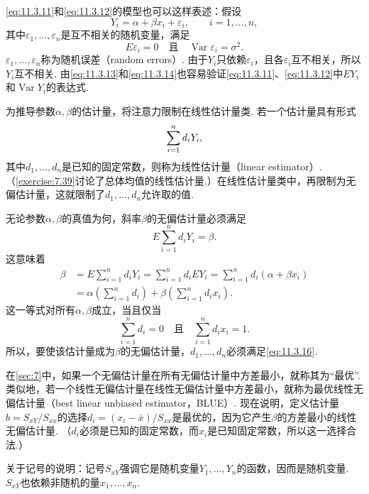 \eqref{eq:11.3.11}和\eqref{eq:11.3.12}的模型也可以这样表述：假设
\begin{equation}\label{eq:11.3.13}
Y_i=\alpha+\beta x_i+\varepsilon_i,\qquad i=1,\ldots,n,
\end{equation}
其中$\varepsilon_1,\ldots,\varepsilon_n$是互不相关的随机变量，满足
\begin{equation}\label{eq:11.3.14}
E\varepsilon_i=0\quad\text{且}\quad\operatorname{Var}\varepsilon_i=\sigma^2.
\end{equation}
$\varepsilon_1,\ldots,\varepsilon_n$称为随机误差（random errors）. 由于$Y_i$只依赖$\varepsilon_i$，且各$\varepsilon_i$互不相关，所以$Y_i$互不相关. 由\eqref{eq:11.3.13}和\eqref{eq:11.3.14}也容易验证\eqref{eq:11.3.11}、\eqref{eq:11.3.12}中$EY_i$和$\operatorname{Var}Y_i$的表达式.

为推导参数$\alpha,\beta$的估计量，将注意力限制在线性估计量类. 若一个估计量具有形式
\begin{equation}\label{eq:11.3.15}\index{SI0792@线性}
\sum_{i=1}^nd_iY_i,
\end{equation}
其中$d_1,\ldots,d_n$是已知的固定常数，则称为线性估计量（linear estimator）. （\autoref{exercise:7.39}讨论了总体均值的线性估计量.）在线性估计量类中，再限制为无偏估计量，这就限制了$d_1,\ldots,d_n$允许取的值.

无论参数$\alpha,\beta$的真值为何，斜率$\beta$的无偏估计量必须满足
$$E\sum_{i=1}^nd_iY_i=\beta.$$
这意味着
\begin{align*}
\beta&=E\sum_{i=1}^nd_iY_i=\sum_{i=1}^nd_iEY_i=\sum_{i=1}^nd_i(\alpha+\beta x_i)\\
&=\alpha\left(\sum_{i=1}^nd_i\right)+\beta\left(\sum_{i=1}^nd_ix_i\right).
\end{align*}
这一等式对所有$\alpha,\beta$成立，当且仅当
\begin{equation}\label{eq:11.3.16}
\sum_{i=1}^nd_i=0\quad\text{且}\quad\sum_{i=1}^nd_ix_i=1.
\end{equation}
所以，要使该估计量成为$\beta$的无偏估计量，$d_1,\ldots,d_n$必须满足\eqref{eq:11.3.16}.

在\autoref{sec:7}中，如果一个无偏估计量在所有无偏估计量中方差最小，就称其为“最优”. 类似地，若一个线性无偏估计量在线性无偏估计量中方差最小，就称为最优线性无偏估计量（best linear unbiased estimator，BLUE）. 现在说明，定义估计量$b=S_{xY}/S_{xx}$的选择$d_i=(x_i-\bar x)/S_{xx}$是最优的，因为它产生$\beta$的方差最小的线性无偏估计量. （$d_i$必须是已知的固定常数，而$x_i$是已知固定常数，所以这一选择合法.）

关于记号的说明：记号$S_{xY}$强调它是随机变量$Y_1,\ldots,Y_n$的函数，因而是随机变量. $S_{xY}$也依赖非随机的量$x_1,\ldots,x_n$.

